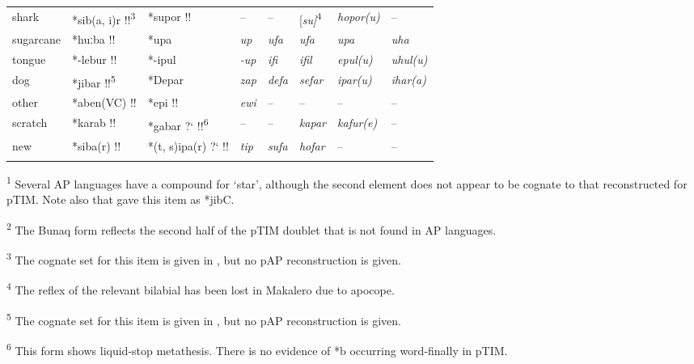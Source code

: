 \begin{sidewaystable}
\begin{tabular*}{\textwidth}{@{\extracolsep{\fill}}llllllll}
shark & *sib(a, i)r !!\textsuperscript{3} & *supor !! & -- & -- & [\textit{su]}\textsuperscript{4} & {\itshape  hopor(u)} & --\\
sugarcane & *huːba !! & *upa &{\itshape  up} &{\itshape  ufa} &{\itshape  ufa} &{\itshape  upa} &{\itshape  uha}\\
tongue & *-lebur !! & *-ipul &{\itshape  {}-up} &{\itshape  ifi} &{\itshape  ifil} &{\itshape  epul(u)} &{\itshape  uhul(u)}\\
dog & *jibar !!\textsuperscript{5} & *Depar &{\itshape  zap} &{\itshape  defa} &{\itshape  sefar} &{\itshape  ipar(u)} &{\itshape  ihar(a)}\\
other & *aben(VC) !! & *epi !! &{\itshape  ewi} & -- & -- & -- & --\\
scratch & *karab !! & *gabar ?` !!\textsuperscript{6} & -- & -- &{\itshape  kapar} &{\itshape  kafur(e)} & --\\
new & *siba(r) !! & *(t, s)ipa(r) ?` !! &{\itshape  tip} & {\itshape sufa} & {\itshape hofar} & -- & --\\
\mybottomrule
\end{tabular*}

 
\raggedright
\textsuperscript{1} Several AP languages have a compound for `star', although the second element does not appear to be cognate to that reconstructed for pTIM. Note also that \citet{HoltonEtAl2012} gave this item as *jibC.

\textsuperscript{2} The Bunaq form reflects the second half of the pTIM doublet that is not found in AP languages.

\textsuperscript{3} The cognate set for this item is given in \citet{HoltonEtAl2012}, but no pAP reconstruction is given.

\textsuperscript{4} The reflex of the relevant bilabial has been lost in Makalero due to apocope.

\textsuperscript{5} The cognate set for this item is given in \citet{HoltonEtAl2012}, but no pAP reconstruction is given.

\textsuperscript{6} This form shows liquid-stop metathesis. There is no evidence of *b occurring word-finally in pTIM.
\end{sidewaystable}




